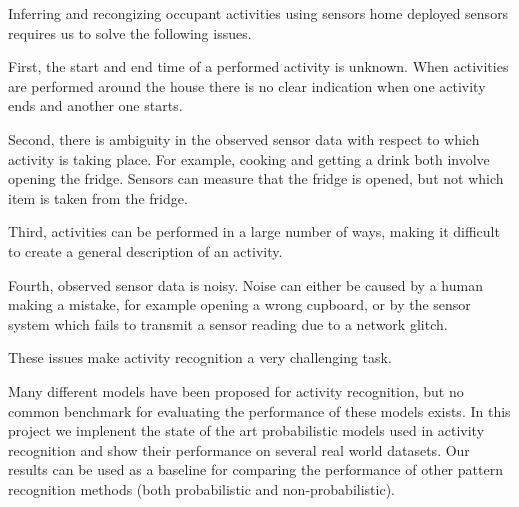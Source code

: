 \documentclass[11pt, oneside]{article}   	%
\begin{document}
Inferring and recongizing occupant activities using sensors home deployed sensors requires us to solve the following issues. 

First, the start and end time of a performed activity is unknown. When activities are performed around the house there is no clear indication when one activity ends and another one starts. 

Second, there is ambiguity in the observed sensor data with respect to which activity is taking place. For example, cooking and getting a drink both involve opening the fridge. Sensors can measure that the fridge is opened, but not which item is taken from the fridge. 

Third, activities can be performed in a large number of ways, making it difficult to create a general description of an activity. 

Fourth, observed sensor data is noisy. Noise can either be caused by a human making a mistake, for example opening a wrong cupboard, or by the sensor system which fails to transmit a sensor reading due to a network glitch.

These issues make activity recognition a very challenging task. 

Many different models have been proposed for activity recognition, but no common benchmark for evaluating the performance of these models exists. In this project we implenent the state of the art probabilistic models used in activity recognition and show their performance on several real world datasets. Our results can be used as a baseline for comparing the performance of other pattern recognition methods (both probabilistic and non-probabilistic). 
\end{document}
